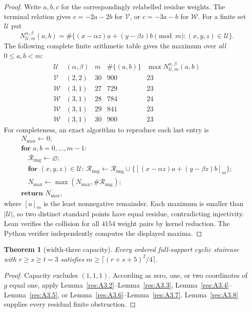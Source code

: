 \documentclass[11pt]{article}
\newtheorem{theorem}{Theorem}[section]
\theoremstyle{definition}
\theoremstyle{remark}
\theoremstyle{plain}
\begin{document}
\begin{proof}
Write $a,b,c$ for the correspondingly relabelled residue weights.
The terminal relation gives $c=-2a-2b$ for $\mathcal V$, or $c=-3a-b$ for $\mathcal W$.
For a finite set $\mathcal U$ put
\[
 N_{\mathcal U,m}^{\alpha,\beta}(a,b)
 =\#\{(x-\alpha z)a+(y-\beta z)b\pmod m:(x,y,z)\in \mathcal U\}.
\]
The following complete finite arithmetic table gives the maximum over
\emph{all} $0\le a,b<m$:
\[
\begin{array}{c|c|c|c|c}
 \mathcal U&(\alpha,\beta)&m&\#\{(a,b)\}&\max N_{\mathcal U,m}^{\alpha,\beta}(a,b)\\\hline
 \mathcal V&(2,2)&30&900&23\\
 \mathcal W&(3,1)&27&729&23\\
 \mathcal W&(3,1)&28&784&24\\
 \mathcal W&(3,1)&29&841&23\\
 \mathcal W&(3,1)&30&900&23
\end{array}
\]
For completeness, an exact algorithm to reproduce each last entry is
\[
\begin{array}{l}
 N_{\max}\gets0;\\
 \textbf{for }a,b=0,\ldots,m-1:\\
 \quad \mathcal R_{\mathrm{img}}\gets\varnothing;\\
 \quad\textbf{for }(x,y,z)\in \mathcal U:\
       \mathcal R_{\mathrm{img}}\gets \mathcal R_{\mathrm{img}}\cup\{[(x-\alpha z)a+(y-\beta z)b]_m\};\\
 \quad N_{\max}\gets\max(N_{\max},\#\mathcal R_{\mathrm{img}});\\
 \textbf{return }N_{\max},
\end{array}
\]
where $[u]_m$ is the least nonnegative remainder. Each maximum is smaller
than $|\mathcal U|$, so two distinct standard points have equal residue, contradicting injectivity.
Lean verifies the collision for all $4154$ weight pairs by kernel reduction.
The Python verifier independently computes the displayed maxima.
\end{proof}


\begin{theorem}[width-three capacity]\label{res:A3.9}
Every ordered full-support cyclic staircase with $r\ge s\ge t=3$ satisfies
$m\ge\lceil(r+s+5)^2/4\rceil$.
\end{theorem}
\begin{proof}
Capacity excludes $(1,1,1)$.  According as zero, one, or two coordinates
of $g$ equal one, apply Lemma~\ref{res:A3.2}--Lemma~\ref{res:A3.3}, Lemma~\ref{res:A3.4}--Lemma~\ref{res:A3.5}, or Lemma~\ref{res:A3.6}--Lemma~\ref{res:A3.7}.
Lemma~\ref{res:A3.8} supplies every residual finite obstruction. \end{proof}
\end{document}
